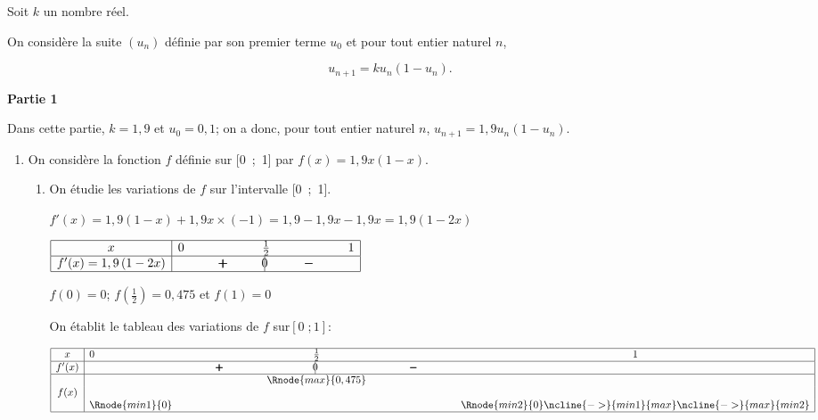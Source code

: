 \medskip

Soit $k$ un nombre réel.

On considère la suite $\left(u_n\right)$ définie par son premier terme $u_0$ et pour tout entier naturel $n$,

\[u_{n+1} = ku_n\left(1- u_n\right).\]





\bigskip

\textbf{Partie 1}

\medskip

Dans cette partie, $k = 1,9$ et $u_0 = 0,1$; on a donc,  pour tout entier naturel $n$,\: $u_{n+1} = 1,9u_n\left(1 - u_n\right)$.



\begin{enumerate}
\item On considère la fonction $f$ définie sur [0~;~1] par $f(x) = 1,9x(1 - x)$.
	\begin{enumerate}
		\item On étudie les variations de $f$ sur l'intervalle [0~;~1].
		
$f'(x)=1,9 \left (1-x\right ) + 1,9x\times(-1) = 1,9 - 1,9x -1,9x = 1,9\left (1-2x\right )$		
		
\begin{center}
\renewcommand{\arraystretch}{1.4}
\def\esp{\hspace*{1.5cm}}
$\begin{array}{|c | *{5}{c} |} 
\hline
x  & 0 & \esp & \frac{1}{2} & \esp  & 1 \\
\hline
f'(x) =1,9\left (1-2x\right )&  & \pmb{+} &  \vline\hspace{-2.7pt}{0} & \pmb{-} &\\
\hline
\end{array}$
\renewcommand{\arraystretch}{1}
\end{center}	

$f(0)=0$; $f\left (\frac{1}{2}\right) = 0,475$ et $f(1)=0$

On établit le tableau des variations de $f$ sur$[0\;; 1]$:

\begin{center}
{\renewcommand{\arraystretch}{1.3}
\def\esp{\hspace*{2.5cm}}
\def\hauteur{0pt}
$\begin{array}{|c|l*4{c}|}
\hline
x & 0  & \esp & \frac{1}{2} & \esp & 1 \\ 
\hline
f'(x) &  & \pmb{+} & \vline\hspace{-2.7pt}0 & \pmb{-} & \\ 
\hline
 & & & \Rnode{max}{0,475}  & & \\
f(x) &  & &  & & \rule{0pt}{\hauteur} \\ 
 &  \Rnode{min1}{0} &   &  &  &   \Rnode{min2}{0} \rule{0pt}{\hauteur}
 \ncline{->}{min1}{max} \ncline{->}{max}{min2} 
 \\
\hline
\end{array} $
}
\end{center}		
		

\end{enumerate}
\end{enumerate}
